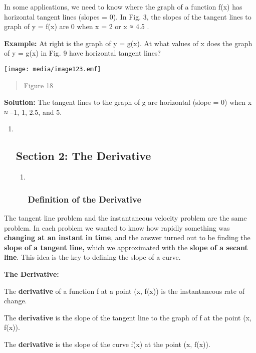 In some applications, we need to know where the graph of a function f(x)
has horizontal tangent lines (slopes = 0). In Fig. 3, the slopes of the
tangent lines to graph of y = f(x) are 0 when x = 2 or x ≈ 4.5 .

\textbf{Example:} At right is the graph of y = g(x). At what values of x
does the graph of y = g(x) in Fig. 9 have horizontal tangent lines?

\texttt{[image: media/image123.emf]}

\begin{quote}
Figure 18
\end{quote}

\textbf{Solution:} The tangent lines to the graph of g are horizontal
(slope = 0) when x ≈ --1, 1, 2.5, and 5.

\begin{enumerate}
\item ~
  \hypertarget{section-2-the-derivative}{\subsection{Section 2: The
  Derivative}\label{section-2-the-derivative}}

  \begin{enumerate}
  \item ~
    \subsubsection{Definition of the
    Derivative}\label{definition-of-the-derivative}
  \end{enumerate}
\end{enumerate}

The tangent line problem and the instantaneous velocity problem are the
same problem. In each problem we wanted to know how rapidly something
was \textbf{changing at an instant in time}, and the answer turned out
to be finding the \textbf{slope of a tangent line,} which we
approximated with the \textbf{slope of a secant line}. This idea is the
key to defining the slope of a curve.

\textbf{The Derivative:}

The \textbf{derivative} of a function f at a point (x, f(x)) is the
instantaneous rate of change.

The \textbf{derivative} is the slope of the tangent line to the graph of
f at the point (x, f(x)).

The \textbf{derivative} is the slope of the curve f(x) at the point (x,
f(x)).

